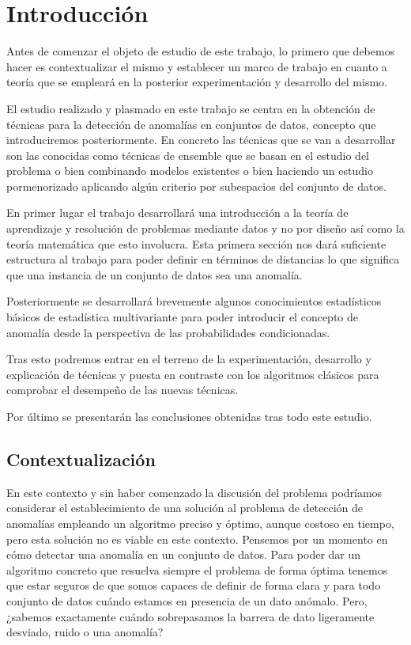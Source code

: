 \chapter{Introducción}

Antes de comenzar el objeto de estudio de este trabajo, lo primero que debemos hacer es contextualizar el mismo y establecer un marco de trabajo en cuanto a teoría que se empleará en la posterior experimentación y desarrollo del mismo. 

El estudio realizado y plasmado en este trabajo se centra en la obtención de técnicas para la detección de anomalías en conjuntos de datos, concepto que introduciremos posteriormente. En concreto las técnicas que se van a desarrollar son las conocidas como técnicas de ensemble que se basan en el estudio del problema o bien combinando modelos existentes o bien haciendo un estudio pormenorizado aplicando algún criterio por subespacios del conjunto de datos. 

En primer lugar el trabajo desarrollará una introducción a la teoría de aprendizaje y resolución de problemas mediante datos y no por diseño así como la teoría matemática que esto involucra. Esta primera sección nos dará suficiente estructura al trabajo para poder definir en términos de distancias lo que significa que una instancia de un conjunto de datos sea una anomalía.

Posteriormente se desarrollará brevemente algunos conocimientos estadísticos básicos de estadística multivariante para poder introducir el concepto de anomalía desde la perspectiva de las probabilidades condicionadas.

Tras esto podremos entrar en el terreno de la experimentación, desarrollo y explicación de técnicas y puesta en contraste con los algoritmos clásicos para comprobar el desempeño de las nuevas técnicas.

Por último se presentarán las conclusiones obtenidas tras todo este estudio.

\section{Contextualización}

En este contexto y sin haber comenzado la discusión del problema podríamos considerar el establecimiento de una solución al problema de detección de anomalías empleando un algoritmo preciso y óptimo, aunque costoso en tiempo, pero esta solución no es viable en este contexto. Pensemos por un momento en cómo detectar una anomalía en un conjunto de datos. Para poder dar un algoritmo concreto que resuelva siempre el problema de forma óptima tenemos que estar seguros de que somos capaces de definir de forma clara y para todo conjunto de datos cuándo estamos en presencia de un dato anómalo. Pero, ¿sabemos exactamente cuándo sobrepasamos la barrera de dato ligeramente desviado, ruido o una anomalía? 

